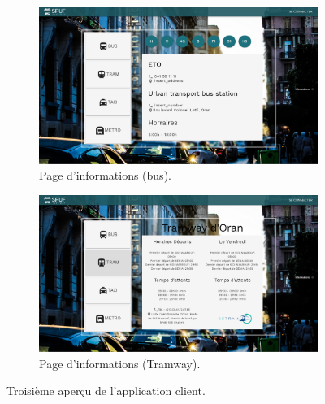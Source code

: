 \begin{figure}
	 \begin{subfigure}[b]{\linewidth}
	 	\includegraphics[width=\linewidth]{img/spuf/infobus.png}
	 	\caption{Page d'informations (bus).}
	 \end{subfigure}
	 
	 \begin{subfigure}[b]{\linewidth}
	 	\includegraphics[width=\linewidth]{img/spuf/infotram.png}
	 	\caption{Page d'informations (Tramway).}	 
	 \end{subfigure}
	 \caption{Troisième aperçu de l'application client.}
	 \label{fig:clientInterface3}
\end{figure}

